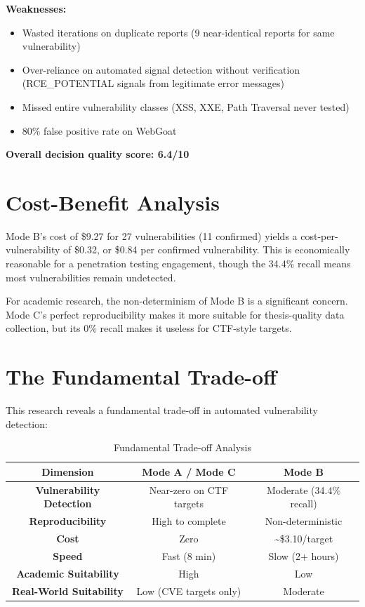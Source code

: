\documentclass[12pt,a4paper,oneside]{book}
\begin{document}
\textbf{Weaknesses:}
\begin{itemize}
    \item Wasted iterations on duplicate reports (9 near-identical reports for same vulnerability)
    \item Over-reliance on automated signal detection without verification (RCE\_POTENTIAL signals from legitimate error messages)
    \item Missed entire vulnerability classes (XSS, XXE, Path Traversal never tested)
    \item 80\% false positive rate on WebGoat
\end{itemize}

\textbf{Overall decision quality score: 6.4/10}

\section{Cost-Benefit Analysis}

Mode B's cost of \$9.27 for 27 vulnerabilities (11 confirmed) yields a cost-per-vulnerability of \$0.32, or \$0.84 per confirmed vulnerability. This is economically reasonable for a penetration testing engagement, though the 34.4\% recall means most vulnerabilities remain undetected.

For academic research, the non-determinism of Mode B is a significant concern. Mode C's perfect reproducibility makes it more suitable for thesis-quality data collection, but its 0\% recall makes it useless for CTF-style targets.

\section{The Fundamental Trade-off}

This research reveals a fundamental trade-off in automated vulnerability detection:

\begin{table}[h]
\centering
\caption{Fundamental Trade-off Analysis}
\label{tab:tradeoff}
\begin{tabular}{|c|c|c|}
\hline
\textbf{Dimension} & \textbf{Mode A / Mode C} & \textbf{Mode B} \\ \hline
\textbf{Vulnerability Detection} & Near-zero on CTF targets & Moderate (34.4\% recall) \\ \hline
\textbf{Reproducibility} & High to complete & Non-deterministic \\ \hline
\textbf{Cost} & Zero & \textasciitilde\$3.10/target \\ \hline
\textbf{Speed} & Fast (8 min) & Slow (2+ hours) \\ \hline
\textbf{Academic Suitability} & High & Low \\ \hline
\textbf{Real-World Suitability} & Low (CVE targets only) & Moderate \\ \hline
\end{tabular}
\end{table}
\end{document}
